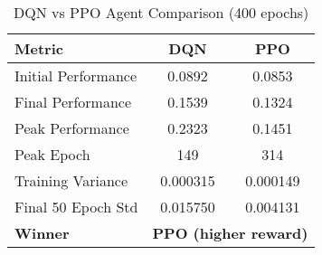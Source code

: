 \begin{table}[htbp]
\centering
\caption{DQN vs PPO Agent Comparison (400 epochs)}
\label{tab:rl_agent_comparison}
\small
\begin{tabular}{lcc}
\toprule
\textbf{Metric} & \textbf{DQN} & \textbf{PPO} \\
\midrule
Initial Performance & 0.0892 & 0.0853 \\
Final Performance & 0.1539 & 0.1324 \\
Peak Performance & 0.2323 & 0.1451 \\
Peak Epoch & 149 & 314 \\
Training Variance & 0.000315 & 0.000149 \\
Final 50 Epoch Std & 0.015750 & 0.004131 \\
\midrule
\textbf{Winner} & \multicolumn{2}{c}{\textbf{PPO (higher reward)}} \\
\bottomrule
\end{tabular}
\end{table}
